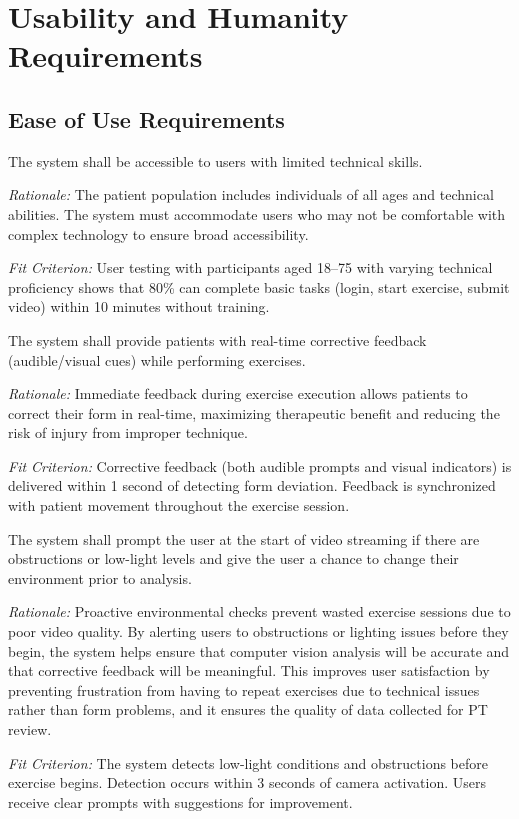 \documentclass[12pt]{article}
\newcommand{\rationale}[1]{\par\emph{Rationale:} #1}
\newcommand{\fitcrit}[1]{\par\emph{Fit Criterion:} #1}
\begin{document}
\section{Usability and Humanity Requirements}

\subsection{Ease of Use Requirements}
\begin{reqlist}
	\item[UHR-EOU 1.] The system shall be accessible to users with limited technical skills.
	\rationale{The patient population includes individuals of all ages and technical abilities. The system must accommodate users who may not be comfortable with complex technology to ensure broad accessibility.}
	\fitcrit{User testing with participants aged 18--75 with varying technical proficiency shows that 80\% can complete basic tasks (login, start exercise, submit video) within 10 minutes without training.}
	
	\item[UHR-EOU 2.] The system shall provide patients with real-time corrective feedback (audible/visual cues) while performing exercises.
	\rationale{Immediate feedback during exercise execution allows patients to correct their form in real-time, maximizing therapeutic benefit and reducing the risk of injury from improper technique.}
	\fitcrit{Corrective feedback (both audible prompts and visual indicators) is delivered within 1 second of detecting form deviation. Feedback is synchronized with patient movement throughout the exercise session.}
	
	\item[UHR-EOU 3.] The system shall prompt the user at the start of video streaming if there are obstructions or low-light levels and give the user a chance to change their environment prior to analysis.
	\rationale{Proactive environmental checks prevent wasted exercise sessions due to poor video quality. By alerting users to obstructions or lighting issues before they begin, the system helps ensure that computer vision analysis will be accurate and that corrective feedback will be meaningful. This improves user satisfaction by preventing frustration from having to repeat exercises due to technical issues rather than form problems, and it ensures the quality of data collected for PT review.}
	\fitcrit{The system detects low-light conditions and obstructions before exercise begins. Detection occurs within 3 seconds of camera activation. Users receive clear prompts with suggestions for improvement.}
	

\end{reqlist}
\end{document}
